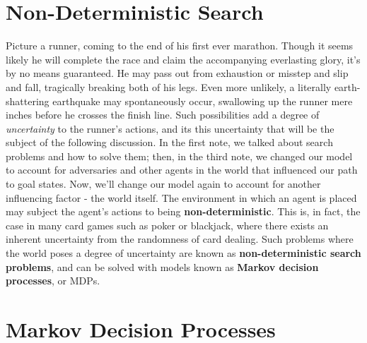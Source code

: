 \documentclass[11pt,fleqn]{article}
\def\title{Note \the\lecturenumber}
\begin{document}
\maketitle

\section*{Non-Deterministic Search}
Picture a runner, coming to the end of his first ever marathon. Though it seems likely he will complete the race and claim the accompanying everlasting glory, it's by no means guaranteed. He may pass out from exhaustion or misstep and slip and fall, tragically breaking both of his legs. Even more unlikely, a literally earth-shattering earthquake may spontaneously occur, swallowing up the runner mere inches before he crosses the finish line. Such possibilities add a degree of \textit{uncertainty} to the runner's actions, and its this uncertainty that will be the subject of the following discussion. In the first note, we talked about search problems and how to solve them; then, in the third note, we changed our model to account for adversaries and other agents in the world that influenced our path to goal states. Now, we'll change our model again to account for another influencing factor - the world itself. The environment in which an agent is placed may subject the agent's actions to being \textbf{non-deterministic}. This is, in fact, the case in many card games such as poker or blackjack, where there exists an inherent uncertainty from the randomness of card dealing. Such problems where the world poses a degree of uncertainty are known as \textbf{non-deterministic search problems}, and can be solved with models known as \textbf{Markov decision processes}, or MDPs.

\section*{Markov Decision Processes}


\end{document}
\end{document}
